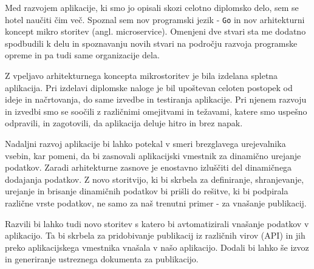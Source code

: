 \documentclass[a4paper, 12pt]{book}
\begin{document}
Med razvojem aplikacije, ki smo jo opisali skozi celotno diplomsko delo, sem se hotel naučiti čim več. Spoznal sem nov programski jezik - \verb=Go= in nov arhitekturni koncept mikro storitev (angl. microservice). Omenjeni dve stvari sta me dodatno spodbudili k delu in spoznavanju novih stvari na področju razvoja programske opreme in pa tudi same organizacije dela.

Z vpeljavo arhitekturnega koncepta mikrostoritev je bila izdelana spletna aplikacija. Pri izdelavi diplomske naloge je bil  upoštevan celoten postopek od ideje in načrtovanja, do same izvedbe in testiranja aplikacije. Pri njenem razvoju in izvedbi smo se soočili z različnimi omejitvami in težavami, katere smo uspešno odpravili, in zagotovili, da aplikacija deluje hitro in brez napak. 

Nadaljni razvoj aplikacije bi lahko potekal v smeri brezglavega urejevalnika vsebin, kar pomeni, da bi zasnovali aplikacijski vmestnik za dinamično urejanje podatkov. Zaradi arhitekturne zasnove je enostavno izluščiti del dinamičnega dodajanja podatkov. Z novo storitvijo, ki bi skrbela za definiranje, shranjevanje, urejanje in brisanje dinamičnih podatkov bi prišli do rešitve, ki bi podpirala različne vrste podatkov, ne samo za naš trenutni primer - za vnašanje publikacij. 

Razvili bi lahko tudi novo storitev s katero bi avtomatizirali vnašanje podatkov v aplikacijo. Ta bi skrbela za pridobivanje publikacij iz različnih virov (API) in jih preko aplikacijskega vmestnika vnašala v našo aplikacijo. Dodali bi lahko še izvoz in generiranje ustreznega dokumenta za publikacijo.

\clearpage
{}


\end{document}

